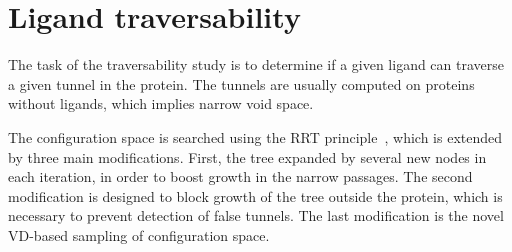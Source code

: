 \documentclass{llncs}
\begin{document}
\section{Ligand traversability}

The task of the traversability study is to determine if a given ligand can traverse  a given tunnel in the protein.
The tunnels are usually computed on proteins without ligands, which implies narrow void space.

The configuration space is searched using the RRT principle~\cite{lavalleRRT}, which is extended by three main modifications.
First, the tree expanded by several new nodes in each iteration, in order to boost growth in the narrow passages.
The second modification is designed to block growth of the tree outside the protein, which is necessary to prevent detection of false
tunnels. 
The last modification is the novel VD-based sampling of configuration space.
\end{document}
